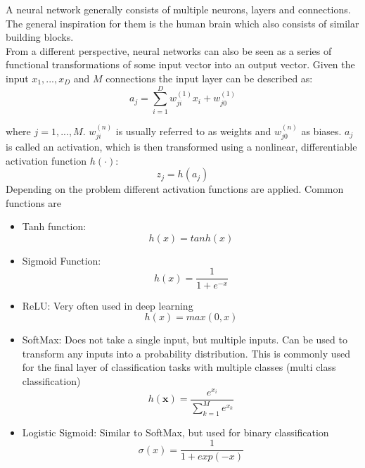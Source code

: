 \documentclass[draft,final,oneside]{vutinfth} %
\begin{document}
A neural network generally consists of multiple neurons, layers and connections. The general inspiration for them is the human brain which also consists of similar building blocks. \\

From a different perspective, neural networks can also be seen as a series of functional transformations of some input vector into an output vector. Given the input $x_1, ..., x_D$ and $M$ connections the input layer can be described as:
\begin{equation}
a_j = \sum_{i=1}^{D} w_{ji}^{(1)}x_i + w_{j0}^{(1)}
\end{equation}

where $j = 1, ..., M$. $w_{ji}^{(n)}$ is usually referred to as weights and $w_{j0}^{(n)}$ as biases. $a_j$ is called an activation, which is then transformed using a nonlinear, differentiable activation function $h(\cdot)$:
\begin{equation}
z_j = h(a_j)
\end{equation}
Depending on the problem different activation functions are applied. Common functions are
\begin{itemize}
\item Tanh function:
\begin{equation}
h(x) = tanh(x)
\end{equation}
\item Sigmoid Function:
\begin{equation}
h(x) = \dfrac {1} {1 + e^{-x}}
\end{equation}
\item ReLU: Very often used in deep learning
\begin{equation}
h(x) = max(0, x)
\end{equation}
\item SoftMax: Does not take a single input, but multiple inputs. Can be used to transform any inputs into a probability distribution. This is commonly used for the final layer of classification tasks with multiple classes (multi class classification)
\begin{equation}
h(\boldsymbol{x}) = \dfrac{e^{x_i}}{\sum_{k=1}^{M} e^{x_k}}
\end{equation}
\item Logistic Sigmoid: Similar to SoftMax, but used for binary classification
\begin{equation}
\sigma(x) = \dfrac{1}{1 + exp(-x)}
\end{equation}
\end{itemize}
\end{document}
